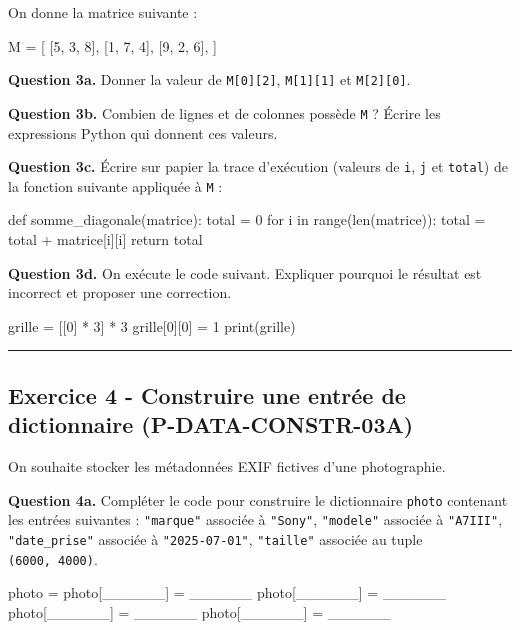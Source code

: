 On donne la matrice suivante :

\begin{python}
M = [
    [5, 3, 8],
    [1, 7, 4],
    [9, 2, 6],
]
\end{python}

\textbf{Question 3a.} Donner la valeur de \texttt{M{[}0{]}{[}2{]}},
\texttt{M{[}1{]}{[}1{]}} et \texttt{M{[}2{]}{[}0{]}}.

\textbf{Question 3b.} Combien de lignes et de colonnes possède
\texttt{M} ? Écrire les expressions Python qui donnent ces valeurs.

\textbf{Question 3c.} Écrire sur papier la trace d'exécution (valeurs de
\texttt{i}, \texttt{j} et \texttt{total}) de la fonction suivante
appliquée à \texttt{M} :

\begin{python}
def somme_diagonale(matrice):
    total = 0
    for i in range(len(matrice)):
        total = total + matrice[i][i]
    return total
\end{python}

\textbf{Question 3d.} On exécute le code suivant. Expliquer pourquoi le
résultat est incorrect et proposer une correction.

\begin{python}
grille = [[0] * 3] * 3
grille[0][0] = 1
print(grille)
\end{python}

\begin{center}\rule{0.5\linewidth}{0.5pt}\end{center}

\subsection{Exercice 4 - Construire une entrée de dictionnaire (P-DATA-CONSTR-03A)}

On souhaite stocker les métadonnées EXIF fictives d'une photographie.

\textbf{Question 4a.} Compléter le code pour construire le dictionnaire
\texttt{photo} contenant les entrées suivantes : \texttt{"marque"}
associée à \texttt{"Sony"}, \texttt{"modele"} associée à
\texttt{"A7III"}, \texttt{"date\_prise"} associée à
\texttt{"2025-07-01"}, \texttt{"taille"} associée au tuple
\texttt{(6000,\ 4000)}.

\begin{python}
photo = {}
photo[______] = ______
photo[______] = ______
photo[______] = ______
photo[______] = ______
\end{python}

